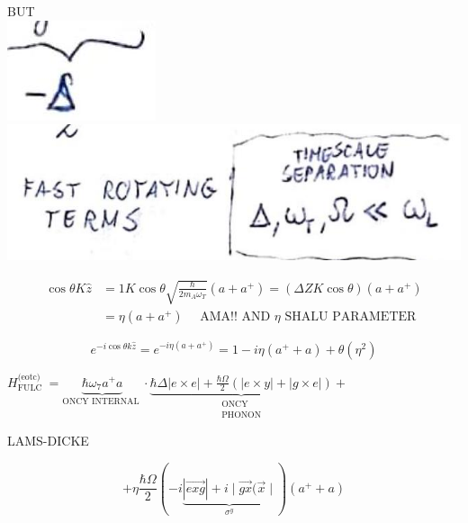 \documentclass[10pt]{article}
\begin{document}
BUT\\
\includegraphics[max width=\textwidth, center]{2025_10_16_9146de9f5ba4f09535e7g-4(3)}\\
\includegraphics[max width=\textwidth, center]{2025_10_16_9146de9f5ba4f09535e7g-4}

$$
\begin{aligned}
\cos \theta K \hat{z} & =1 K \cos \theta \sqrt{\frac{\hbar}{2 m_{A} \omega_{T}}}\left(a+a^{+}\right)=(\Delta Z K \cos \theta)\left(a+a^{+}\right) \\
& =\eta\left(a+a^{+}\right) \quad \text { AMA!! AND } \eta \text { SHALU PARAMETER }
\end{aligned}
$$

$$
e^{-i \cos \theta k \hat{z}}=e^{-i \eta\left(a+a^{+}\right)}=1-i \eta\left(a^{+}+a\right)+\theta\left(\eta^{2}\right)
$$

$H_{\text {FULC }}^{\text {(eotc) }}=\underbrace{\hbar \omega_{7} a^{+} a}_{\text {ONCY INTERNAL }} \cdot \underbrace{\hbar \Delta|e \times e|+\frac{\hbar \Omega}{2}(|e \times y|+|g \times e|)}_{\substack{\text { ONCY } \\ \text { PHONON }}}+$

LAMS-DICKE

$$
+\eta \frac{\hbar \Omega}{2}(-i \underbrace{|\overrightarrow{e x g}|+i \mid \overrightarrow{g x}(\vec{x} \mid}_{\sigma^{y}})\left(a^{+}+a\right)
$$
\end{document}

